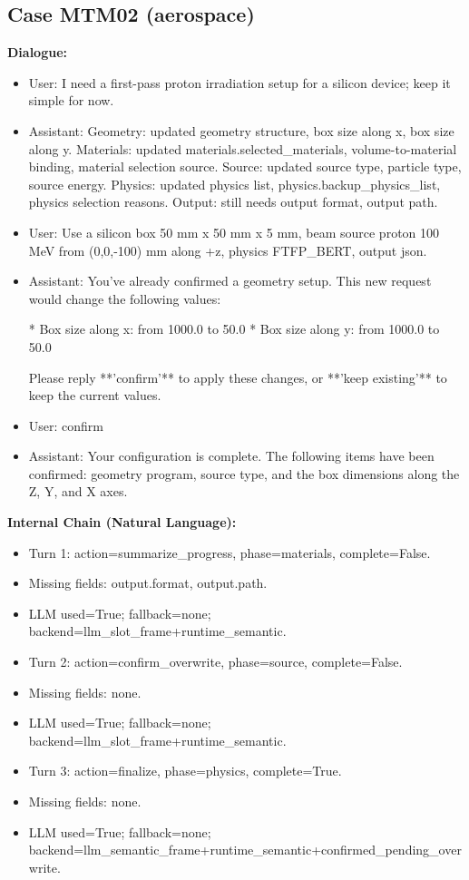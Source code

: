 \documentclass[11pt]{ctexart}
\begin{document}
\subsection{Case MTM02 (aerospace)}
\textbf{Dialogue:}
\begin{itemize}
\item User: I need a first-pass proton irradiation setup for a silicon device; keep it simple for now.
\item Assistant: Geometry: updated geometry structure, box size along x, box size along y. Materials: updated materials.selected\_materials, volume-to-material binding, material selection source. Source: updated source type, particle type, source energy. Physics: updated physics list, physics.backup\_physics\_list, physics selection reasons. Output: still needs output format, output path.
\item User: Use a silicon box 50 mm x 50 mm x 5 mm, beam source proton 100 MeV from (0,0,-100) mm along +z, physics FTFP\_BERT, output json.
\item Assistant: You've already confirmed a geometry setup. This new request would change the following values:

*   Box size along x: from 1000.0 to 50.0
*   Box size along y: from 1000.0 to 50.0

Please reply **'confirm'** to apply these changes, or **'keep existing'** to keep the current values.
\item User: confirm
\item Assistant: Your configuration is complete. The following items have been confirmed: geometry program, source type, and the box dimensions along the Z, Y, and X axes.
\end{itemize}
\textbf{Internal Chain (Natural Language):}
\begin{itemize}
\item Turn 1: action=summarize\_progress, phase=materials, complete=False.
\item Missing fields: output.format, output.path.
\item LLM used=True; fallback=none; backend=llm\_slot\_frame+runtime\_semantic.
\item Turn 2: action=confirm\_overwrite, phase=source, complete=False.
\item Missing fields: none.
\item LLM used=True; fallback=none; backend=llm\_slot\_frame+runtime\_semantic.
\item Turn 3: action=finalize, phase=physics, complete=True.
\item Missing fields: none.
\item LLM used=True; fallback=none; backend=llm\_semantic\_frame+runtime\_semantic+confirmed\_pending\_overwrite.
\end{itemize}
\end{document}
